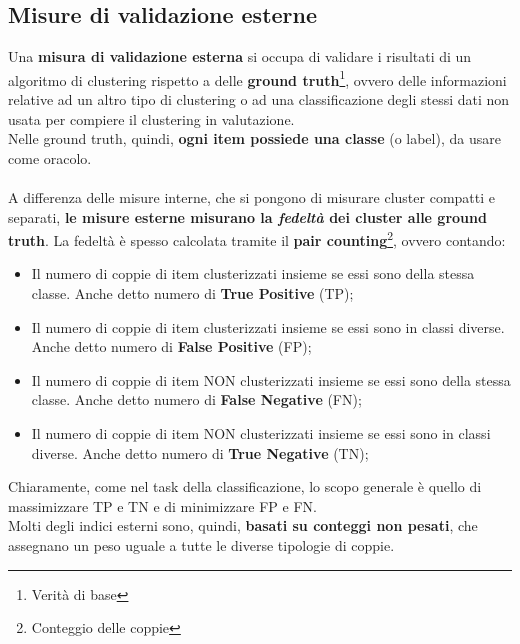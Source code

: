 \subsection{Misure di validazione esterne}
Una \textbf{misura di validazione esterna} si occupa di validare i risultati di un algoritmo di clustering rispetto a delle \textbf{ground truth}\footnote{Verità di base}, ovvero delle informazioni relative ad un altro tipo di clustering o ad una classificazione degli stessi dati non usata per compiere il clustering in valutazione.\\
Nelle ground truth, quindi, \textbf{ogni item possiede una classe} (o label), da usare come oracolo.\\
\\
A differenza delle misure interne, che si pongono di misurare cluster compatti e separati, \textbf{le misure esterne misurano la \textit{fedeltà} dei cluster alle ground truth}. La fedeltà è spesso calcolata tramite il \textbf{pair counting}\footnote{Conteggio delle coppie}, ovvero contando:
\begin{itemize}
	\item Il numero di coppie di item clusterizzati insieme se essi sono della stessa classe. Anche detto numero di \textbf{True Positive} (TP);
	\item Il numero di coppie di item clusterizzati insieme se essi sono in classi diverse. Anche detto numero di \textbf{False Positive} (FP);
	\item Il numero di coppie di item NON clusterizzati insieme se essi sono della stessa classe. Anche detto numero di \textbf{False Negative} (FN);
	\item Il numero di coppie di item NON clusterizzati insieme se essi sono in classi diverse. Anche detto numero di \textbf{True Negative} (TN);
\end{itemize}
Chiaramente, come nel task della classificazione, lo scopo generale è quello di massimizzare TP e TN e di minimizzare FP e FN.\\
Molti degli indici esterni sono, quindi, \textbf{basati su conteggi non pesati}, che assegnano un peso uguale a tutte le diverse tipologie di coppie.

